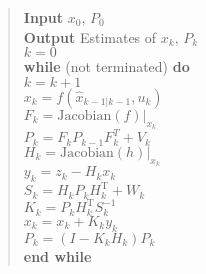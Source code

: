 \begin{quote}
\textbf{Input} \(x_0\), \(P_0\)\\
\textbf{Output} Estimates of \(x_k\), \(P_k\)\\
\(k=0\)\\
\textbf{while} (not terminated) \textbf{do}\\
\hspace*{0.333em}\hspace*{0.333em}\hspace*{0.333em}\(k=k+1\)\\
\hspace*{0.333em}\hspace*{0.333em}\hspace*{0.333em}\(x_k = f(\hat{x}_{k-1|k-1}, u_{k})\)\\
\hspace*{0.333em}\hspace*{0.333em}\hspace*{0.333em}\(F_k =  \mbox{Jacobian}(f)|_{x_k}\)\\
\hspace*{0.333em}\hspace*{0.333em}\hspace*{0.333em}\(P_{k} = F_{k} P_{k-1} F_{k}^{T} + V_{k}\)\\
\hspace*{0.333em}\hspace*{0.333em}\hspace*{0.333em}\(H_k = \mbox{Jacobian}(h)|_{x_k}\)\\
\hspace*{0.333em}\hspace*{0.333em}\hspace*{0.333em}\(y_k = z_k - H_k x_{k}\)\\
\hspace*{0.333em}\hspace*{0.333em}\hspace*{0.333em}\(S_k = H_k P_{k} H_k^\text{T} + W_k\)\\
\hspace*{0.333em}\hspace*{0.333em}\hspace*{0.333em}\(K_k = P_{k}H_k^\text{T}S_k^{-1}\)\\
\hspace*{0.333em}\hspace*{0.333em}\hspace*{0.333em}\(x_k =   x_{k} + K_k y_k\)\\
\hspace*{0.333em}\hspace*{0.333em}\hspace*{0.333em}\(P_{k} = (I - K_k H_k) P_{k}\)\\
\textbf{end while}
\end{quote}

